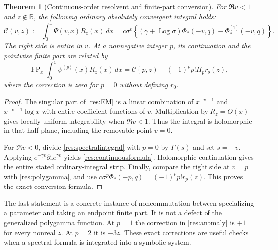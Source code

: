 \documentclass[11pt,a4paper]{article}
\numberwithin{equation}{section}
\newtheorem{theorem}{Theorem}[section]
\theoremstyle{definition}
\theoremstyle{remark}
\DeclareMathOperator{\Log}{Log}
\begin{document}
\begin{theorem}[Continuous-order resolvent and finite-part conversion]
\label{res:continuous}
For $\Re v<1$ and $z\notin\mathbb R$, the following ordinary
absolutely convergent integral holds:
\begin{equation}\label{res:continuousformula}
 \mathcal C(v,z):=\int_0^1\Psi(v,x)R_z(x)\,dx
   =c\sigma^v\left\{(\gamma+\Log\sigma)\Phi_*(-v,q)
                                         -\Phi_*^{[1]}(-v,q)\right\}.
\end{equation}
The right side is entire in $v$. At a nonnegative integer $p$,
its continuation and the pointwise finite part are related by
\begin{equation}\label{res:anomaly}
 \operatorname{FP}_x\int_0^1\psi^{(p)}(x)R_z(x)\,dx
    =\mathcal C(p,z)-(-1)^pp!H_p r_p(z),
\end{equation}
where the correction is zero for $p=0$ without defining $r_0$.
\end{theorem}

\begin{proof}
The singular part of \eqref{res:EM} is a linear combination of
$x^{-v-1}$ and $x^{-v-1}\log x$ with entire coefficient functions
of $v$. Multiplication by $R_z=O(x)$ gives locally uniform
integrability when $\Re v<1$. Thus the integral is holomorphic
in that half-plane, including the removable point $v=0$.

For $\Re v<0$, divide \eqref{res:spectralintegral} with $p=0$
by $\Gamma(s)$ and set $s=-v$. Applying
$e^{-\gamma v}\partial_v e^{\gamma v}$ yields
\eqref{res:continuousformula}. Holomorphic continuation gives
the entire stated ordinary-integral strip. Finally, compare the
right side at $v=p$ with \eqref{res:polygamma}, and use
$c\sigma^p\Phi_*(-p,q)=(-1)^pp!r_p(z)$.
This proves the exact conversion formula.
\end{proof}

The last statement is a concrete instance of noncommutation between
specializing a parameter and taking an endpoint finite part. It is
not a defect of the generalized polygamma function. At $p=1$ the
correction in \eqref{res:anomaly} is $+1$ for every nonreal $z$.
At $p=2$ it is $-3z$. These exact corrections are useful checks
when a spectral formula is integrated into a symbolic system.
\end{document}
